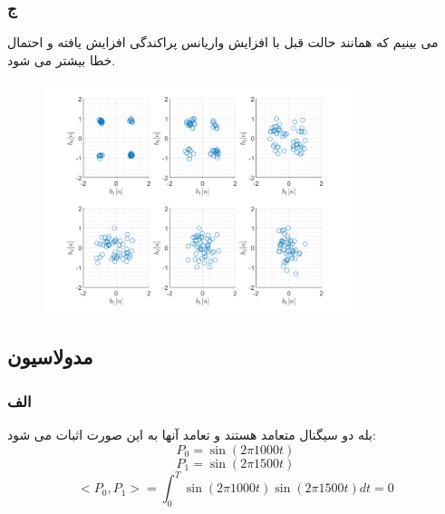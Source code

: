 \documentclass[a4paper]{article}
\begin{document}
	\subsubsection*{ج}
	می بینیم که همانند حالت قبل با افزایش واریانس پراکندگی افزایش یافته و احتمال خطا بیشتر می شود.
	\begin{figure}[H]
		\includegraphics[width=0.8\textwidth]{comsys_fig34.png}\\ 
		\centering
	\end{figure}
	\subsection{مدولاسیون }
	\subsubsection*{الف}
	بله دو سیگنال متعامد هستند و تعامد آنها به این صورت اثبات می شود:
	\begin{equation*}
		P_0 = \sin (2 \pi 1000 t)
	\end{equation*}
	\begin{equation*}
		P_1 = \sin (2 \pi 1500 t)
	\end{equation*}
	\begin{equation*}
		\big<P_0 , P_1\big> = \int_{0}^{T} \sin (2 \pi 1000 t) \sin (2 \pi 1500 t) dt = 0 
	\end{equation*}
\end{document}
